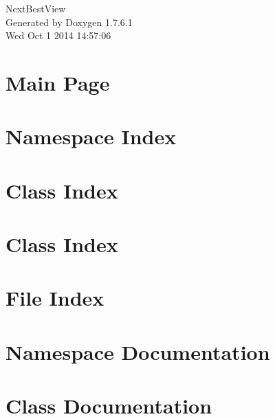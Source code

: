 \documentclass[a4paper]{book}
\begin{document}
\hypersetup{pageanchor=false,citecolor=blue}
\begin{titlepage}
\vspace*{7cm}
\begin{center}
{\Large \-Next\-Best\-View }\\
\vspace*{1cm}
{\large \-Generated by Doxygen 1.7.6.1}\\
\vspace*{0.5cm}
{\small Wed Oct 1 2014 14:57:06}\\
\end{center}
\end{titlepage}
\clearemptydoublepage
{}
\tableofcontents
\clearemptydoublepage
{}
\hypersetup{pageanchor=true,citecolor=blue}
\chapter{\-Main \-Page}
\label{index}\hypertarget{index}{}
\chapter{\-Namespace \-Index}

\chapter{\-Class \-Index}

\chapter{\-Class \-Index}

\chapter{\-File \-Index}

\chapter{\-Namespace \-Documentation}

\chapter{\-Class \-Documentation}




















\end{document}
